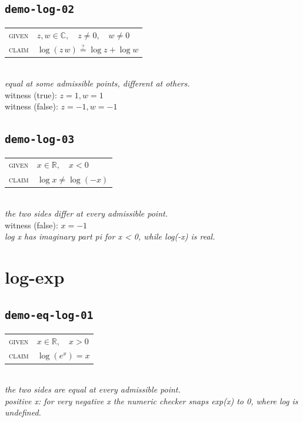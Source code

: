 \documentclass[11pt]{article}
\begin{document}
\subsection*{\texttt{demo-log-02}}
\begin{tabular}{@{}l@{\quad}l@{}}
\textsc{given} & $z, w \in \mathbb{C},\quad z \neq 0,\quad w \neq 0$ \\[4pt]
\textsc{claim} & $\displaystyle \log\left(z \, w\right) \overset{?}{=} \log z + \log w$ \\
\end{tabular}\\[2pt]
{\small\emph{equal at some admissible points, different at others.}}\\
{\footnotesize\color{gray}witness (true): $z = 1, w = 1$}\\
{\footnotesize\color{gray}witness (false): $z = -1, w = -1$}\\

\subsection*{\texttt{demo-log-03}}
\begin{tabular}{@{}l@{\quad}l@{}}
\textsc{given} & $x \in \mathbb{R},\quad x < 0$ \\[4pt]
\textsc{claim} & $\displaystyle \log x \neq \log\left(-x\right)$ \\
\end{tabular}\\[2pt]
{\small\emph{the two sides differ at every admissible point.}}\\
{\footnotesize\color{gray}witness (false): $x = -1$}\\
\emph{log x has imaginary part pi for x < 0, while log(-x) is real.}\\

\section*{log-exp}
\subsection*{\texttt{demo-eq-log-01}}
\begin{tabular}{@{}l@{\quad}l@{}}
\textsc{given} & $x \in \mathbb{R},\quad x > 0$ \\[4pt]
\textsc{claim} & $\displaystyle \log\left(e^{x}\right) = x$ \\
\end{tabular}\\[2pt]
{\small\emph{the two sides are equal at every admissible point.}}\\
\emph{positive x: for very negative x the numeric checker snaps exp(x) to 0, where log is undefined.}\\
\end{document}

